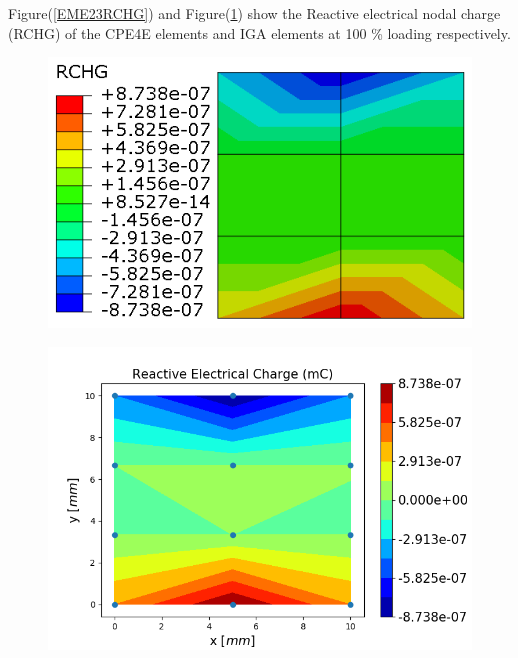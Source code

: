 \documentclass[11pt]{article}
\begin{document}
Figure(\ref{EME23RCHG}) and Figure(\ref{EME23RCHG_IGA}) show the Reactive electrical nodal charge (RCHG) of the CPE4E elements and IGA elements at 100 \% loading respectively. \\
\begin{figure}[H]
	\centering
	\begin{minipage}{.5\textwidth}
		\centering
		\includegraphics[width=1\linewidth]{EME23RCHG.png}
		\label{EME23RCHG}
	\end{minipage}%
	\begin{minipage}{.6\textwidth}
		\centering
		\includegraphics[width=1\linewidth]{EME23RCHG_IGA.png}
		\label{EME23RCHG_IGA}
	\end{minipage}
\end{figure}
\end{document}
